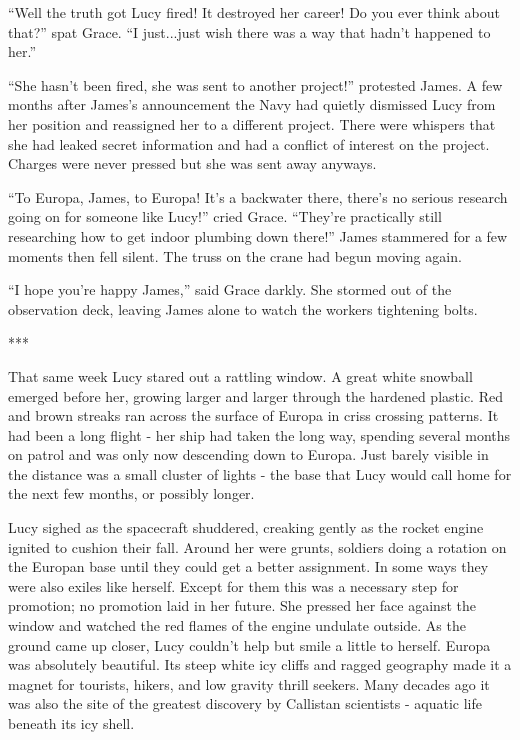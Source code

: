 \documentclass[12pt]{article} %
\begin{document}
``Well the truth got Lucy fired! It destroyed her career! Do you ever think about that?'' spat Grace. ``I just...just wish there was a way that hadn't happened to her.''

``She hasn't been fired, she was sent to another project!'' protested James. A few months after James's announcement the Navy had quietly dismissed Lucy from her position and reassigned her to a different project. There were whispers that she had leaked secret information and had a conflict of interest on the project. Charges were never pressed but she was sent away anyways.

``To Europa, James, to Europa! It's a backwater there, there's no serious research going on for someone like Lucy!'' cried Grace. ``They're practically still researching how to get indoor plumbing down there!'' James stammered for a few moments then fell silent. The truss on the crane had begun moving again.

``I hope you're happy James,'' said Grace darkly. She stormed out of the observation deck, leaving James alone to watch the workers tightening bolts.

\begin{center}
***
\end{center}

That same week Lucy stared out a rattling window. A great white snowball emerged before her, growing larger and larger through the hardened plastic. Red and brown streaks ran across the surface of Europa in criss crossing patterns. It had been a long flight - her ship had taken the long way, spending several months on patrol and was only now descending down to Europa. Just barely visible in the distance was a small cluster of lights - the base that Lucy would call home for the next few months, or possibly longer.

Lucy sighed as the spacecraft shuddered, creaking gently as the rocket engine ignited to cushion their fall. Around her were grunts, soldiers doing a rotation on the Europan base until they could get a better assignment. In some ways they were also exiles like herself. Except for them this was a necessary step for promotion; no promotion laid in her future. She pressed her face against the window and watched the red flames of the engine undulate outside. As the ground came up closer, Lucy couldn't help but smile a little to herself. Europa was absolutely beautiful. Its steep white icy cliffs and ragged geography made it a magnet for tourists, hikers, and low gravity thrill seekers. Many decades ago it was also the site of the greatest discovery by Callistan scientists - aquatic life beneath its icy shell.
\end{document}
